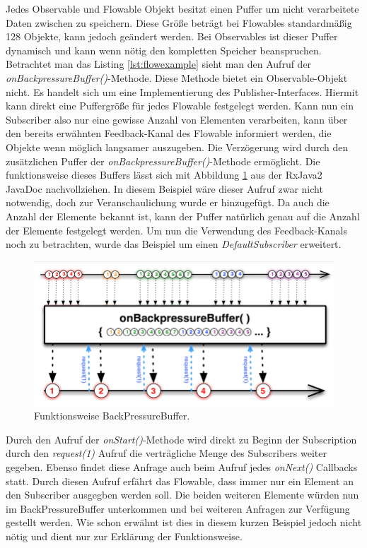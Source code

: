 
Jedes Observable und Flowable Objekt besitzt einen Puffer um nicht verarbeitete 
Daten zwischen zu speichern. Diese Größe beträgt bei Flowables standardmäßig 128 
Objekte, kann jedoch geändert werden. Bei Observables ist dieser Puffer 
dynamisch und kann wenn nötig den kompletten Speicher beanspruchen. Betrachtet 
man das Listing \ref{lst:flowexample} sieht man den Aufruf der 
\textit{onBackpressureBuffer()}-Methode. Diese Methode bietet ein 
Observable-Objekt nicht. Es handelt sich um eine Implementierung des 
Publisher-Interfaces. Hiermit kann direkt eine Puffergröße für jedes Flowable 
festgelegt werden. Kann nun ein Subscriber also nur eine gewisse Anzahl von 
Elementen verarbeiten, kann über den bereits erwähnten Feedback-Kanal des 
Flowable informiert werden, die Objekte wenn möglich langsamer auszugeben. Die 
Verzögerung wird durch den zusätzlichen Puffer der 
\textit{onBackpressureBuffer()}-Methode ermöglicht. Die funktionsweise dieses 
Buffers lässt sich mit Abbildung \ref{pic:bbbuffer} aus der 
RxJava2 JavaDoc nachvollziehen. In diesem Beispiel wäre dieser Aufruf zwar 
nicht notwendig, doch zur Veranschaulichung wurde er hinzugefügt. Da auch die 
Anzahl der Elemente bekannt ist, kann der Puffer natürlich genau auf die Anzahl 
der Elemente festgelegt werden.
Um nun die Verwendung des Feedback-Kanals noch zu betrachten, wurde das 
Beispiel um einen \textit{DefaultSubscriber} erweitert.
\begin{figure}[hbt]
	\centering
	\includegraphics[width=1\textwidth]{Abb/backpressurebuffer}
	\caption{Funktionsweise BackPressureBuffer.}
	\label{pic:bbbuffer}
\end{figure}
Durch den Aufruf der \textit{onStart()}-Methode wird direkt zu Beginn der Subscription durch den \textit{request(1)} Aufruf die verträgliche Menge des Subscribers weiter gegeben. Ebenso findet diese Anfrage auch beim Aufruf jedes \textit{onNext()} Callbacks statt. Durch diesen Aufruf erfährt das Flowable, dass immer nur ein Element an den Subscriber ausgegben werden soll. Die beiden weiteren Elemente würden nun im BackPressureBuffer unterkommen und bei weiteren Anfragen zur Verfügung gestellt werden. Wie schon erwähnt ist dies in diesem kurzen Beispiel jedoch nicht nötig und dient nur zur Erklärung der Funktionsweise.
